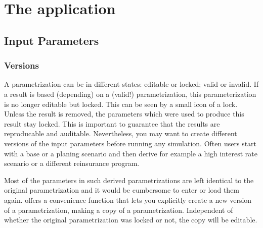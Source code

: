 \chapter{The application}
\label{chap:riskAnalyticsApplication}

\section{Input Parameters}
\label{sec:inputParameters}


\subsection{Versions}
\label{subsec:parameterVersions}

A parametrization can be in different states: editable or locked; valid or invalid. If a result is based (depending) on a (valid!) parametrization, this parameterization is no longer editable but locked. This can be seen by a small icon of a lock.  Unless the result is removed, the parameters which were used to produce this result stay locked. This is important to guarantee that the results are reproducable and auditable. Nevertheless, you may want to create different versions of the input parameters before running any simulation. Often users start with a base or a planing scenario and then derive for example a high interest rate scenario or a different reinsurance program.


Most of the parameters in such derived parametrizations are left identical to the original parametrization and it would be cumbersome to enter or load them again. \RA{} offers a convenience function that lets you explicitly create a new version of a parametrization, \ie making a copy of a parametrization. Independent of whether the original parametrization was locked or not, the copy will be editable.



